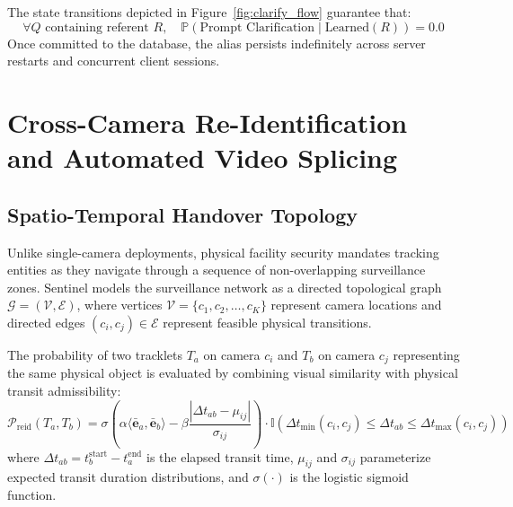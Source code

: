 \documentclass[12pt,a4paper]{article}
\begin{document}
The state transitions depicted in Figure~\ref{fig:clarify_flow} guarantee that:
\begin{equation}
\forall Q \text{ containing referent } R, \quad \mathbb{P}(\text{Prompt Clarification} \mid \text{Learned}(R)) = 0.0
\end{equation}
Once committed to the database, the alias persists indefinitely across server restarts and concurrent client sessions.

\section{Cross-Camera Re-Identification and Automated Video Splicing}

\subsection{Spatio-Temporal Handover Topology}
Unlike single-camera deployments, physical facility security mandates tracking entities as they navigate through a sequence of non-overlapping surveillance zones. Sentinel models the surveillance network as a directed topological graph $\mathcal{G} = (\mathcal{V}, \mathcal{E})$, where vertices $\mathcal{V} = \{c_1, c_2, \dots, c_K\}$ represent camera locations and directed edges $(c_i, c_j) \in \mathcal{E}$ represent feasible physical transitions.

The probability of two tracklets $T_a$ on camera $c_i$ and $T_b$ on camera $c_j$ representing the same physical object is evaluated by combining visual similarity with physical transit admissibility:
\begin{equation}
\mathcal{P}_{\text{reid}}(T_a, T_b) = \sigma\left(\alpha \langle \bar{\mathbf{e}}_a, \bar{\mathbf{e}}_b \rangle - \beta \frac{|\Delta t_{ab} - \mu_{ij}|}{\sigma_{ij}}\right) \cdot \mathbb{I}\left(\Delta t_{\text{min}}(c_i, c_j) \le \Delta t_{ab} \le \Delta t_{\text{max}}(c_i, c_j)\right)
\end{equation}
where $\Delta t_{ab} = t_b^{\text{start}} - t_a^{\text{end}}$ is the elapsed transit time, $\mu_{ij}$ and $\sigma_{ij}$ parameterize expected transit duration distributions, and $\sigma(\cdot)$ is the logistic sigmoid function.
\end{document}
